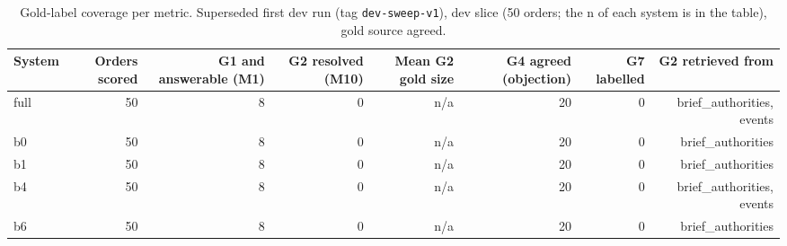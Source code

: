 \begin{table}[t]
\centering
\small
\caption{Gold-label coverage per metric. Superseded first dev run (tag \texttt{dev-sweep-v1}), dev slice (50 orders; the n of each system is in the table), gold source agreed.}
\label{tab:table_label_coverage}
\begin{adjustbox}{max width=\textwidth}
\begin{tabular}{lrrrrrrr}
\toprule
System & Orders scored & G1 and answerable (M1) & G2 resolved (M10) & Mean G2 gold size & G4 agreed (objection) & G7 labelled & G2 retrieved from \\
\midrule
full & 50 & 8 & 0 & n/a & 20 & 0 & brief\_authorities, events \\
b0 & 50 & 8 & 0 & n/a & 20 & 0 & brief\_authorities \\
b1 & 50 & 8 & 0 & n/a & 20 & 0 & brief\_authorities \\
b4 & 50 & 8 & 0 & n/a & 20 & 0 & brief\_authorities, events \\
b6 & 50 & 8 & 0 & n/a & 20 & 0 & brief\_authorities \\
\bottomrule
\end{tabular}
\end{adjustbox}
\end{table}

